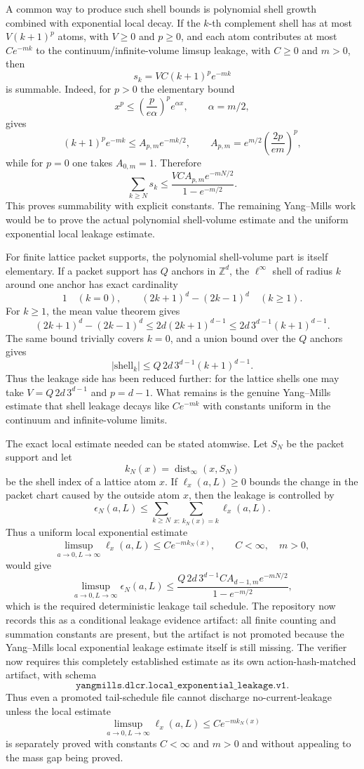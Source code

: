 A common way to produce such shell bounds is polynomial shell growth combined
with exponential local decay. If the $k$-th complement shell has at most
$V(k+1)^p$ atoms, with $V\geq0$ and $p\geq0$, and each atom contributes at most
$C e^{-mk}$ to the continuum/infinite-volume limsup leakage, with $C\geq0$ and
$m>0$, then
\[
  s_k=VC(k+1)^p e^{-mk}
\]
is summable. Indeed, for $p>0$ the elementary bound
\[
  x^p\leq \left(\frac{p}{e\alpha}\right)^p e^{\alpha x},
  \qquad \alpha=m/2,
\]
gives
\[
  (k+1)^p e^{-mk}
  \leq
  A_{p,m}e^{-mk/2},
  \qquad
  A_{p,m}=e^{m/2}\left(\frac{2p}{em}\right)^p ,
\]
while for $p=0$ one takes $A_{0,m}=1$. Therefore
\[
  \sum_{k\geq N}s_k
  \leq
  \frac{VCA_{p,m}e^{-mN/2}}{1-e^{-m/2}} .
\]
This proves summability with explicit constants. The remaining Yang--Mills
work would be to prove the actual polynomial shell-volume estimate and the
uniform exponential local leakage estimate.

For finite lattice packet supports, the polynomial shell-volume part is itself
elementary. If a packet support has $Q$ anchors in $\mathbb Z^d$, the
$\ell^\infty$ shell of radius $k$ around one anchor has exact cardinality
\[
  1\quad(k=0),\qquad
  (2k+1)^d-(2k-1)^d\quad(k\geq1).
\]
For $k\geq1$, the mean value theorem gives
\[
  (2k+1)^d-(2k-1)^d
  \leq
  2d(2k+1)^{d-1}
  \leq
  2d\,3^{d-1}(k+1)^{d-1}.
\]
The same bound trivially covers $k=0$, and a union bound over the $Q$ anchors
gives
\[
  |\mathrm{shell}_k|
  \leq
  Q\,2d\,3^{d-1}(k+1)^{d-1}.
\]
Thus the leakage side has been reduced further: for the lattice shells one may
take $V=Q\,2d\,3^{d-1}$ and $p=d-1$. What remains is the genuine Yang--Mills
estimate that shell leakage decays like $Ce^{-mk}$ with constants uniform in
the continuum and infinite-volume limits.

The exact local estimate needed can be stated atomwise. Let $S_N$ be the packet
support and let
\[
  k_N(x)=\operatorname{dist}_\infty(x,S_N)
\]
be the shell index of a lattice atom $x$. If $\ell_x(a,L)\geq0$ bounds the
change in the packet chart caused by the outside atom $x$, then the leakage is
controlled by
\[
  \epsilon_N(a,L)
  \leq
  \sum_{k\geq N}\sum_{x:\,k_N(x)=k}\ell_x(a,L).
\]
Thus a uniform local exponential estimate
\[
  \limsup_{a\to0,L\to\infty}\ell_x(a,L)
  \leq
  C e^{-m k_N(x)},\qquad C<\infty,\quad m>0,
\]
would give
\[
  \limsup_{a\to0,L\to\infty}\epsilon_N(a,L)
  \leq
  \frac{Q\,2d\,3^{d-1}C A_{d-1,m}e^{-mN/2}}{1-e^{-m/2}},
\]
which is the required deterministic leakage tail schedule. The repository now
records this as a conditional leakage evidence artifact: all finite counting
and summation constants are present, but the artifact is not promoted because
the Yang--Mills local exponential leakage estimate itself is still missing.
The verifier now requires this completely established estimate as its own action-hash-matched
artifact, with schema
\[
  \texttt{yangmills.dlcr.local\_exponential\_leakage.v1}.
\]
Thus even a promoted tail-schedule file cannot discharge no-current-leakage
unless the local estimate
\[
  \limsup_{a\to0,L\to\infty}\ell_x(a,L)
  \leq C e^{-m k_N(x)}
\]
is separately proved with constants $C<\infty$ and $m>0$ and without appealing
to the mass gap being proved.


